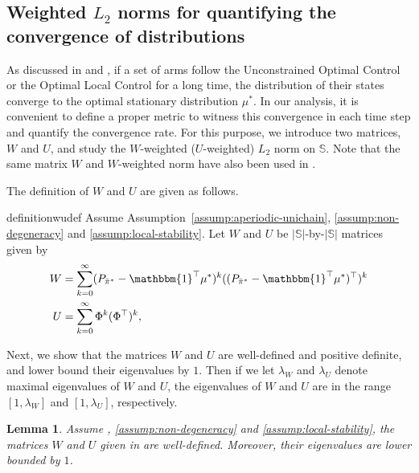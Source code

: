 \documentclass[11pt,letterpaper]{article}
\theoremstyle{plain}
\newtheorem{lemma}{Lemma}
\theoremstyle{definition}
\theoremstyle{remark}
\newcommand{\vone}{\mathbbm{1}}
\newcommand{\sspa}{\mathbb{S}}
\newcommand{\pibar}{{\sysbar{\pi}}}
\newcommand{\pibs}{{\pibar^*}}
\newcommand{\sysbar}[1]{\bar{#1}}
\newcommand{\statdist}{\mu^*}
\newcommand{\wmat}{W}
\newcommand{\umat}{U}
\newcommand{\lamw}{\lambda_\wmat}
\newcommand{\lamu}{\lambda_\umat}
\begin{document}
\subsection{Weighted $L_2$ norms for quantifying the convergence of distributions}\label{app:weighted-l2-norm-lemmas}
As discussed in  and , if a set of arms follow the Unconstrained Optimal Control or the Optimal Local Control for a long time, the distribution of their states converge to the optimal stationary distribution $\statdist$. 
In our analysis, it is convenient to define a proper metric to witness this convergence in each time step and quantify the convergence rate. 
For this purpose, we introduce two matrices, $\wmat$ and $\umat$, and study the $\wmat$-weighted ($\umat$-weighted) $L_2$ norm on $\sspa$. 
Note that the same matrix $\wmat$ and $\wmat$-weighted norm have also been used in \cite{HonXieCheWan_24}. 

The definition of $\wmat$ and $\umat$ are given as follows. 

\begin{restatable}{definition}{wudef}\label{def:w-and-u}
    Assume Assumption~\ref{assump:aperiodic-unichain}, \ref{assump:non-degeneracy} and \ref{assump:local-stability}. 
    Let $\wmat$ and $\umat$ be $|\sspa|$-by-$|\sspa|$ matrices given by  
    \begin{align}
        \label{eq:w-def}
        \wmat &= \sum_{k=0}^\infty (P_\pibs - \vone^\top \statdist)^k ((P_\pibs - \vone^\top \statdist)^\top)^k \\
        \umat &= \sum_{k=0}^\infty \Phi^k (\Phi^\top)^k,
    \end{align}
\end{restatable}



Next, we show that the matrices $\wmat$ and $\umat$ are well-defined and positive definite, and lower bound their eigenvalues by $1$. Then if we let $\lamw$ and $\lamu$ denote maximal eigenvalues of $\wmat$ and $\umat$, the eigenvalues of $\wmat$ and  $\umat$ are in the range $[1, \lamw]$ and $[1, \lamu]$, respectively. 


\begin{lemma}\label{lem:W-U-well-defined}
    Assume , \ref{assump:non-degeneracy} and \ref{assump:local-stability}, the matrices $\wmat$ and $\umat$ given in  are well-defined. Moreover, their eigenvalues are lower bounded by $1$. 
\end{lemma}
\end{document}
